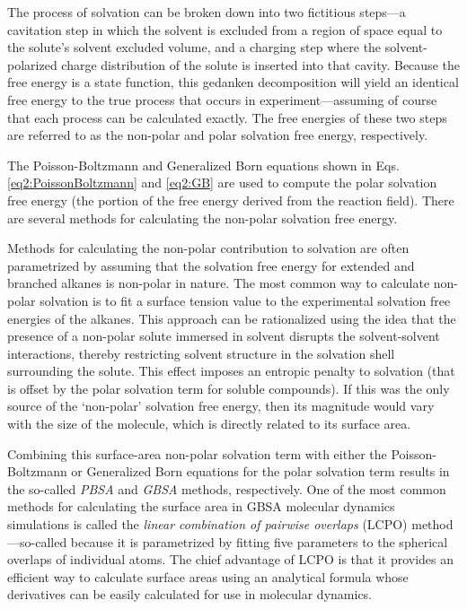 The process of solvation can be broken down into two fictitious steps---a
cavitation step in which the solvent is excluded from a region of space equal to
the solute's solvent excluded volume, and a charging step where the
solvent-polarized charge distribution of the solute is inserted into that
cavity. Because the free energy is a state function, this gedanken decomposition
will yield an identical free energy to the true process that occurs in
experiment---assuming of course that each process can be calculated exactly.
The free energies of these two steps are referred to as the non-polar and polar
solvation free energy, respectively.

The Poisson-Boltzmann and Generalized Born equations shown in Eqs.
\ref{eq2:PoissonBoltzmann} and \ref{eq2:GB} are used to compute the polar
solvation free energy (\ie the portion of the free energy derived from the
reaction field). There are several methods for calculating the non-polar
solvation free energy.

Methods for calculating the non-polar contribution to solvation are often
parametrized by assuming that the solvation free energy for extended and
branched alkanes is non-polar in nature. The most common way to calculate
non-polar solvation is to fit a surface tension value to the experimental
solvation free energies of the alkanes.
\cite{Cramer_Book_EssentialsCompChem_2004} This approach can be rationalized
using the idea that the presence of a non-polar solute immersed in solvent
disrupts the solvent-solvent interactions, thereby restricting solvent structure
in the solvation shell surrounding the solute. This effect imposes an entropic
penalty to solvation (that is offset by the polar solvation term for soluble
compounds).  If this was the only source of the `non-polar' solvation free
energy, then its magnitude would vary with the size of the molecule, which is
directly related to its surface area.

Combining this surface-area non-polar solvation term with either the
Poisson-Boltzmann or Generalized Born equations for the polar solvation term
results in the so-called \emph{PBSA} and \emph{GBSA} methods, respectively. One
of the most common methods for calculating the surface area in GBSA molecular
dynamics simulations is called the \emph{linear combination of pairwise
overlaps} (LCPO) method---so-called because it is parametrized by fitting five
parameters to the spherical overlaps of individual atoms.
\cite{Weiser_JComputChem_1999_v20_p217} The chief advantage of LCPO is that it
provides an efficient way to calculate surface areas using an analytical formula
whose derivatives can be easily calculated for use in molecular dynamics.

